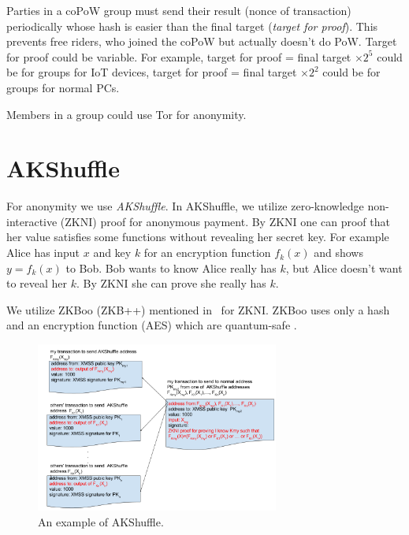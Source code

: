 \documentclass[a4paper,10pt,twocolumn]{article}
\begin{document}
Parties in a coPoW group must send their result (nonce of transaction) periodically whose hash 
is easier than the final target (\emph{target for proof}). This prevents free riders, who joined the coPoW but actually doesn't do PoW.
Target for proof could be variable. For example, target for proof = final target \(  \times 2^5 \) could be for groups for IoT devices,
target for proof = final target  \( \times 2^2 \) could be for groups for normal PCs.

Members in a group could use Tor for anonymity.


\section{AKShuffle}
\label{sec:aks}

For anonymity we use \emph{AKShuffle}. In AKShuffle, we utilize zero-knowledge non-interactive (ZKNI) proof for
anonymous payment. By ZKNI one can proof that her value satisfies some functions without revealing her secret key.
For example Alice has input \(x\)  and key \( k \)  for an encryption function \( f_{k}(x) \) and shows \( y=f_k(x) \) to Bob.
Bob wants to know Alice really has \(k\), but Alice doesn't want to reveal her \(k\).
By ZKNI  she can prove she really has \( k\).

We utilize ZKBoo (ZKB++) mentioned in~\cite{zkb} for ZKNI. ZKBoo uses only a hash and an encryption function (AES) which are quantum-safe \cite{pqcrypto}.


\begin{figure}[ht]
	\begin{center}
	\includegraphics[width=80mm]{shuffle.png}
	  \caption{An example of AKShuffle.}
    \label{fig:shuffle}
	\end{center}
 \end{figure}
\end{document}

